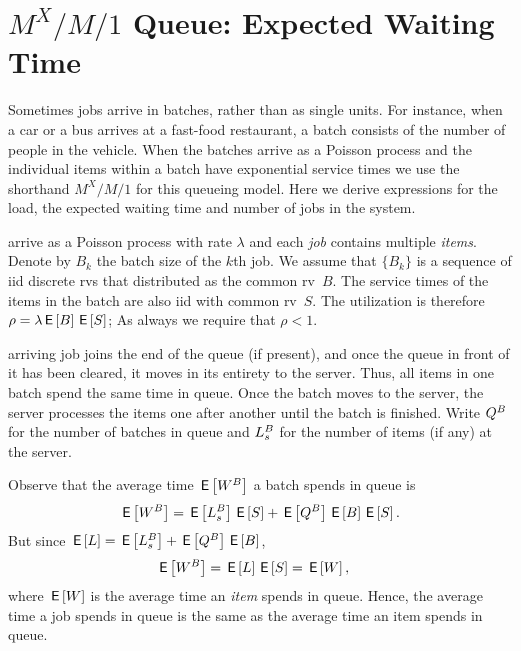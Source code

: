 


\section{$M^X/M/1$ Queue: Expected Waiting Time}
\label{sec:mxm1-queue:-expected}

Sometimes jobs arrive in batches, rather than as single units.
For instance, when a car or a bus arrives at a fast-food restaurant, a batch consists of the number of people in the vehicle.
When the batches arrive as a Poisson process and the individual items within a batch have exponential service times we use the shorthand $M^X/M/1$ for this queueing model.
Here we derive expressions for the load, the expected waiting time and number of jobs in the system.


 arrive as a Poisson process with rate $\lambda$ and each \emph{job} contains multiple \emph{items}.
Denote by $B_k$ the batch size of the $k$th job.
We assume that $\{B_k\}$ is a sequence of iid discrete rvs that distributed as the common rv~$B$. The service times of the items in the batch are also iid with common rv~$S$. The utilization is therefore
$\rho = \lambda \,\mathsf{E}\left[B\right] \,\mathsf{E}\left[S\right]$;
As always we require that $\rho<1$.


 arriving job joins the end of the queue (if present), and once the queue in front of it has been cleared, it moves in its entirety to the server.
Thus, all items in one batch spend the same time in queue.
Once the batch moves to the server, the server processes the items one after another until the batch is finished.
Write $Q^B$ for the number of batches in queue and $L_s^B$ for the number of items (if any) at the server.


Observe that the average time $\,\mathsf{E}\left[W^{B}\right]$ a batch spends in queue is
\begin{equation}\label{eq:mxm1-1}
  \,\mathsf{E}\left[W^B\right] =  \,\mathsf{E}\left[L_s^B\right]\,\mathsf{E}\left[S\right] + \,\mathsf{E}\left[Q^B\right] \,\mathsf{E}\left[B\right] \,\mathsf{E}\left[S\right].
\end{equation}
But since $\,\mathsf{E}\left[L\right] = \,\mathsf{E}\left[L_s^B\right] + \,\mathsf{E}\left[Q^B\right] \,\mathsf{E}\left[B\right]$,
\begin{align*}
  \,\mathsf{E}\left[W^B\right] &=  \,\mathsf{E}\left[L\right] \,\mathsf{E}\left[S\right] = \,\mathsf{E}\left[W\right],
\end{align*}
where $\,\mathsf{E}\left[W\right]$ is the average time an \emph{item} spends in queue.
Hence, the average time a job spends in queue is the same as the average time an item spends in queue.

